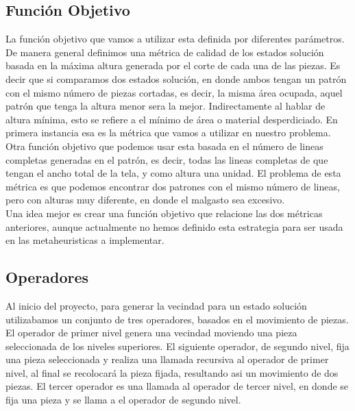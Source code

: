 \documentclass[letterpaper,11pt]{article}
\begin{document}
\subsection{Funci\'on Objetivo}

La funci\'on objetivo que vamos a utilizar esta definida por diferentes par\'ametros. De manera general definimos
una m\'etrica de calidad de los estados soluci\'on basada en la m\'axima altura generada por el corte de cada una de las piezas.
Es decir que si comparamos dos estados soluci\'on, en donde ambos tengan un patr\'on con el mismo n\'umero de piezas cortadas, 
es decir, la misma \'area ocupada, aquel patr\'on que tenga la altura menor sera la mejor. 
Indirectamente al hablar de altura m\'inima, esto se refiere a el m\'inimo de \'area o material desperdiciado.
En primera instancia esa es la m\'etrica que vamos a utilizar en nuestro problema.\\

Otra funci\'on objetivo que podemos usar esta basada en el n\'umero de lineas completas generadas en el patr\'on, es decir,
todas las lineas completas de que tengan el ancho total de la tela, y como altura una unidad. El problema de esta m\'etrica es que podemos encontrar dos patrones con el mismo n\'umero de lineas, pero con alturas muy diferente, en donde el malgasto sea excesivo.\\

Una idea mejor es crear una funci\'on objetivo que relacione las dos m\'etricas anteriores, aunque actualmente no 
hemos definido esta estrategia para ser usada en las metaheuristicas a implementar.

\subsection{Operadores}

Al inicio del proyecto, para generar la vecindad para un estado soluci\'on utilizabamos un conjunto de tres operadores, basados en el movimiento de piezas. El operador
de primer nivel genera una vecindad moviendo una pieza seleccionada de los niveles superiores. El siguiente operador, de segundo nivel, fija una pieza seleccionada y realiza una llamada recursiva al operador de primer nivel, al final se recolocar\'a la pieza fijada, resultando asi un movimiento de dos piezas. El tercer operador es una llamada al operador de tercer nivel, en donde se fija una pieza y se llama a el operador de segundo nivel.\\
\end{document}
